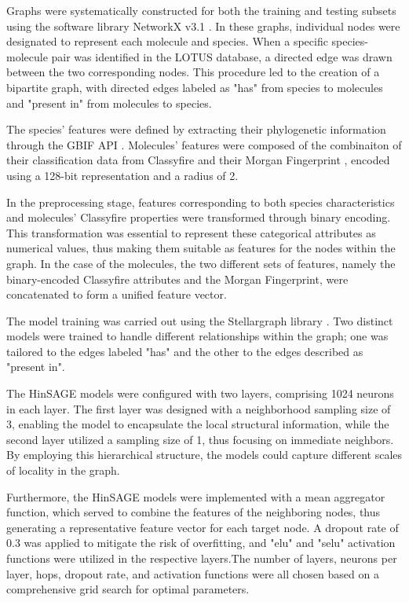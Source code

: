 \documentclass[
11pt, %
oneside, %
english, %
singlespacing, %
headsepline, %
chapterinoneline, %
]{MastersDoctoralThesis} %
\begin{document}
Graphs were systematically constructed for both the training and testing subsets using the software library NetworkX v3.1 \cite{SciPyProceedings_11}. In these graphs, individual nodes were designated to represent each molecule and species. When a specific species-molecule pair was identified in the LOTUS database, a directed edge was drawn between the two corresponding nodes. This procedure led to the creation of a bipartite graph, with directed edges labeled as "has" from species to molecules and "present in" from molecules to species.

The species' features were defined by extracting their phylogenetic information through the GBIF API \cite{GBIF, GbifPygbif2023}. Molecules' features were composed of the combinaiton of their classification data from Classyfire \cite{djoumboufeunangClassyFireAutomatedChemical2016} and their Morgan Fingerprint \cite{rogersExtendedConnectivityFingerprints2010}, encoded using a 128-bit representation and a radius of 2.

In the preprocessing stage, features corresponding to both species characteristics and molecules' Classyfire properties were transformed through binary encoding. This transformation was essential to represent these categorical attributes as numerical values, thus making them suitable as features for the nodes within the graph. In the case of the molecules, the two different sets of features, namely the binary-encoded Classyfire attributes and the Morgan Fingerprint, were concatenated to form a unified feature vector.

The model training was carried out using the Stellargraph library \cite{StellarGraphMachineLearning2018}. Two distinct models were trained to handle different relationships within the graph; one was tailored to the edges labeled "has" and the other to the edges described as "present in".

The HinSAGE models were configured with two layers, comprising 1024 neurons in each layer. The first layer was designed with a neighborhood sampling size of 3, enabling the model to encapsulate the local structural information, while the second layer utilized a sampling size of 1, thus focusing on immediate neighbors. By employing this hierarchical structure, the models could capture different scales of locality in the graph.

Furthermore, the HinSAGE models were implemented with a mean aggregator function, which served to combine the features of the neighboring nodes, thus generating a representative feature vector for each target node. A dropout rate of 0.3 was applied to mitigate the risk of overfitting, and "elu" and "selu" activation functions were utilized in the respective layers.The number of layers, neurons per layer, hops, dropout rate, and activation functions were all chosen based on a comprehensive grid search for optimal parameters.
\end{document}
